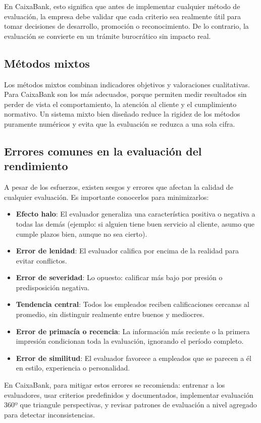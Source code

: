 En CaixaBank, esto significa que antes de implementar cualquier método de evaluación, la empresa debe validar que cada criterio sea realmente útil para tomar decisiones de desarrollo, promoción o reconocimiento. De lo contrario, la evaluación se convierte en un trámite burocrático sin impacto real.

\subsection{Métodos mixtos}
Los métodos mixtos combinan indicadores objetivos y valoraciones cualitativas. Para CaixaBank son los más adecuados, porque permiten medir resultados sin perder de vista el comportamiento, la atención al cliente y el cumplimiento normativo. Un sistema mixto bien diseñado reduce la rigidez de los métodos puramente numéricos y evita que la evaluación se reduzca a una sola cifra.

\subsection*{Errores comunes en la evaluación del rendimiento}
A pesar de los esfuerzos, existen sesgos y errores que afectan la calidad de cualquier evaluación. Es importante conocerlos para minimizarlos:
\begin{itemize}[leftmargin=*]
	\item \textbf{Efecto halo}: El evaluador generaliza una característica positiva o negativa a todas las demás (ejemplo: si alguien tiene buen servicio al cliente, asumo que cumple plazos bien, aunque no sea cierto).
	\item \textbf{Error de lenidad}: El evaluador califica por encima de la realidad para evitar conflictos.
	\item \textbf{Error de severidad}: Lo opuesto: calificar más bajo por presión o predisposición negativa.
	\item \textbf{Tendencia central}: Todos los empleados reciben calificaciones cercanas al promedio, sin distinguir realmente entre buenos y mediocres.
	\item \textbf{Error de primacía o recencia}: La información más reciente o la primera impresión condicionan toda la evaluación, ignorando el período completo.
	\item \textbf{Error de similitud}: El evaluador favorece a empleados que se parecen a él en estilo, experiencia o personalidad.
\end{itemize}

En CaixaBank, para mitigar estos errores se recomienda: entrenar a los evaluadores, usar criterios predefinidos y documentados, implementar evaluación 360º que triangule perspectivas, y revisar patrones de evaluación a nivel agregado para detectar inconsistencias.

